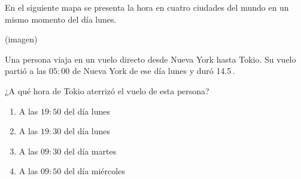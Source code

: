\begin{problem}
    En el siguiente mapa se presenta la hora en cuatro ciudades del mundo en un mismo momento del día lunes.

    \begin{center}
    (imagen)
    \end{center}

    Una persona viaja en un vuelo directo desde Nueva York hasta Tokio. Su vuelo partió a las $05:00$  de Nueva York de ese día lunes y duró 14.5\,.

    ¿A qué hora de Tokio aterrizó el vuelo de esta persona?

    \begin{enumerate}[label=\Alph*.]
        \item A las $19:50$  del día lunes
        \item A las $19:30$  del día lunes
        \item A las $09:30$  del día martes
        \item A las $09:50$  del día miércoles
    \end{enumerate}
\end{problem}
